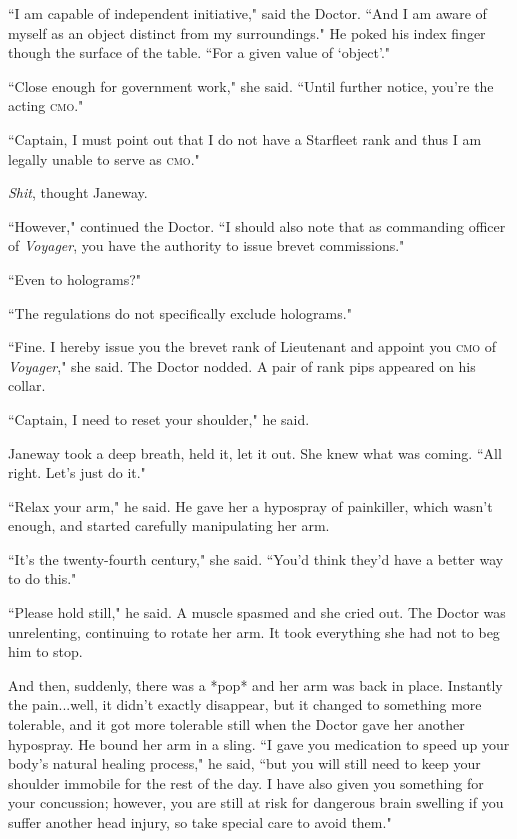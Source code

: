 \documentclass[twoside,letterpaper,12pt]{memoir}
\begin{document}
``I am capable of independent initiative," said the Doctor. ``And I am aware of myself as an object distinct from my surroundings." He poked his index finger though the surface of the table. ``For a given value of `object'."

``Close enough for government work," she said. ``Until further notice, you're the acting \textsc{cmo}."

``Captain, I must point out that I do not have a Starfleet rank and thus I am legally unable to serve as \textsc{cmo}."

\textit{Shit}, thought Janeway.

``However," continued the Doctor. ``I should also note that as commanding officer of \textit{Voyager}, you have the authority to issue brevet commissions."

``Even to holograms?"

``The regulations do not specifically exclude holograms."

``Fine. I hereby issue you the brevet rank of Lieutenant and appoint you \textsc{cmo} of \textit{Voyager}," she said. The Doctor nodded. A pair of rank pips appeared on his collar.

``Captain, I need to reset your shoulder," he said.

Janeway took a deep breath, held it, let it out. She knew what was coming. ``All right. Let's just do it."

``Relax your arm," he said. He gave her a hypospray of painkiller, which wasn't enough, and started carefully manipulating her arm.

``It's the twenty-fourth century," she said. ``You'd think they'd have a better way to do this."

``Please hold still," he said. A muscle spasmed and she cried out. The Doctor was unrelenting, continuing to rotate her arm. It took everything she had not to beg him to stop.

And then, suddenly, there was a *pop* and her arm was back in place. Instantly the pain...well, it didn't exactly disappear, but it changed to something more tolerable, and it got more tolerable still when the Doctor gave her another hypospray. He bound her arm in a sling. ``I gave you medication to speed up your body's natural healing process," he said, ``but you will still need to keep your shoulder immobile for the rest of the day. I have also given you something for your concussion; however, you are still at risk for dangerous brain swelling if you suffer another head injury, so take special care to avoid them."
\end{document}
